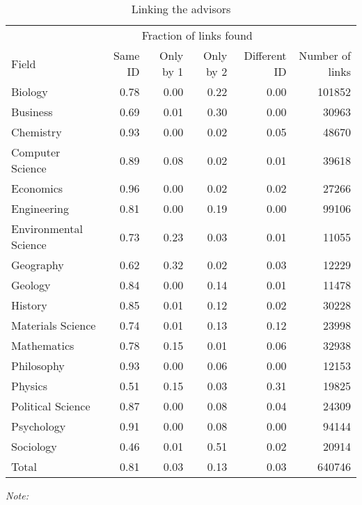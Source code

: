 \begin{table}

\caption{\label{tab:compare_linking_advisors}Linking the advisors}
\centering
\fontsize{9}{11}\selectfont
\begin{threeparttable}
\begin{tabular}[t]{lrrrrr}
\toprule
\multicolumn{1}{c}{ } & \multicolumn{4}{c}{Fraction of links found} & \multicolumn{1}{c}{ } \\
Field & Same ID & Only by 1 & Only by 2 & Different ID & Number of links\\
\midrule
Biology & 0.78 & 0.00 & 0.22 & 0.00 & 101852\\
Business & 0.69 & 0.01 & 0.30 & 0.00 & 30963\\
Chemistry & 0.93 & 0.00 & 0.02 & 0.05 & 48670\\
Computer Science & 0.89 & 0.08 & 0.02 & 0.01 & 39618\\
Economics & 0.96 & 0.00 & 0.02 & 0.02 & 27266\\
\addlinespace
Engineering & 0.81 & 0.00 & 0.19 & 0.00 & 99106\\
Environmental Science & 0.73 & 0.23 & 0.03 & 0.01 & 11055\\
Geography & 0.62 & 0.32 & 0.02 & 0.03 & 12229\\
Geology & 0.84 & 0.00 & 0.14 & 0.01 & 11478\\
History & 0.85 & 0.01 & 0.12 & 0.02 & 30228\\
\addlinespace
Materials Science & 0.74 & 0.01 & 0.13 & 0.12 & 23998\\
Mathematics & 0.78 & 0.15 & 0.01 & 0.06 & 32938\\
Philosophy & 0.93 & 0.00 & 0.06 & 0.00 & 12153\\
Physics & 0.51 & 0.15 & 0.03 & 0.31 & 19825\\
Political Science & 0.87 & 0.00 & 0.08 & 0.04 & 24309\\
\addlinespace
Psychology & 0.91 & 0.00 & 0.08 & 0.00 & 94144\\
Sociology & 0.46 & 0.01 & 0.51 & 0.02 & 20914\\
\midrule
Total & 0.81 & 0.03 & 0.13 & 0.03 & 640746\\
\bottomrule
\end{tabular}
\begin{tablenotes}[para]
\small
\item \textit{Note: } 

\end{tablenotes}
\end{threeparttable}
\end{table}
